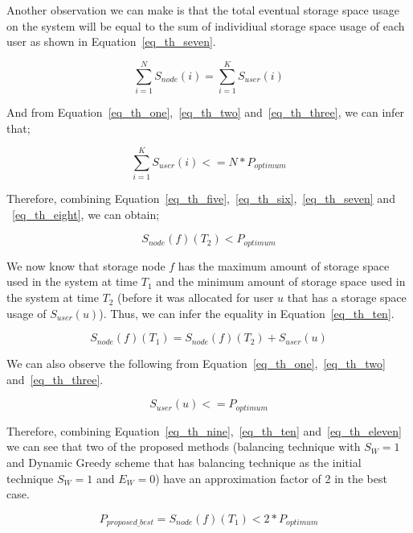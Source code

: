 \documentclass[preprint,12pt]{elsarticle}
\begin{document}
Another observation we can make is that the total eventual storage space usage on the system
will be equal to the sum of individiual storage space usage of each user as shown in Equation~\eqref{eq_th_seven}. 

\begin{equation}
\sum\limits_{i=1}^{N}S_{node}(i) = \sum\limits_{i=1}^{K}S_{user}(i)
\label{eq_th_seven}
\end{equation}
\hfill

And from Equation~\eqref{eq_th_one},~\eqref{eq_th_two} and~\eqref{eq_th_three}, we can infer that;

\begin{equation}
\sum\limits_{i=1}^{K}S_{user}(i) <= N * P_{optimum}
\label{eq_th_eight}
\end{equation}
\hfill

Therefore, combining Equation~\eqref{eq_th_five},~\eqref{eq_th_six},~\eqref{eq_th_seven} and
~\eqref{eq_th_eight}, we can obtain;

\begin{equation}
S_{node}(f)(T_2) < P_{optimum}
\label{eq_th_nine}
\end{equation}
\hfill

We now know that storage node $f$ has the maximum amount of storage space used in the system at
time $T_1$ and the minimum amount of storage space used in the system at time $T_2$ (before it
was allocated for user $u$ that has a storage space usage of $S_{user}(u)$). Thus, we can infer
the equality in Equation~\eqref{eq_th_ten}.

\begin{equation}
S_{node}(f)(T_1) = S_{node}(f)(T_2) + S_{user}(u)
\label{eq_th_ten}
\end{equation}
\hfill

We can also observe the following from Equation~\eqref{eq_th_one},~\eqref{eq_th_two} and~\eqref{eq_th_three}.

\begin{equation}
S_{user}(u) <= P_{optimum}
\label{eq_th_eleven}
\end{equation}
\hfill

Therefore, combining Equation~\eqref{eq_th_nine},~\eqref{eq_th_ten} and~\eqref{eq_th_eleven}
we can see that two of the proposed methods (balancing technique with $S_W = 1$ and
Dynamic Greedy scheme that has balancing technique as the initial technique $S_W = 1$ and
$E_W = 0$) have an approximation factor of 2 in the best case.

\begin{equation}
P_{proposed\_best} = S_{node}(f)(T_1) < 2 * P_{optimum}
\label{eq_th_twelve}
\end{equation}
\hfill
\end{document}
